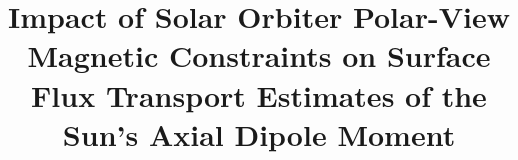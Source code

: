 \documentclass[namedreferences,hyperref,optionalrh]{spr-sola}
\begin{document}
\begin{frontmatter}
\title{Impact of Solar Orbiter Polar-View Magnetic Constraints on Surface Flux Transport Estimates of the Sun’s Axial Dipole Moment}

\author[addressref={aff1,aff2},email={mtalafha901@gmail.com}]{~}
\address[id=aff1]{Research Institute of Sciences and Engineering, University of Sharjah, Sharjah, UAE}
\address[id=aff2]{HUN-REN WIGNER Research Centre for Physics, Budapest, Hungary}



\end{frontmatter}
\end{document}
